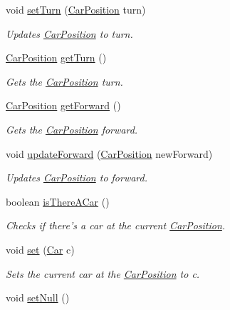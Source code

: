 \begin{DoxyCompactItemize}
void \hyperlink{class_car_position_abfa74c31e5ca43d0c2c06f637ee8533f}{set\+Turn} (\hyperlink{class_car_position}{Car\+Position} turn)
\begin{DoxyCompactList}\small\item\em Updates \hyperlink{class_car_position}{Car\+Position} to turn. \end{DoxyCompactList}\item 
\hyperlink{class_car_position}{Car\+Position} \hyperlink{class_car_position_a01b5b7e2cb4c51114e3f42e7fa150c74}{get\+Turn} ()
\begin{DoxyCompactList}\small\item\em Gets the \hyperlink{class_car_position}{Car\+Position} turn. \end{DoxyCompactList}\item 
\hyperlink{class_car_position}{Car\+Position} \hyperlink{class_car_position_a4238bc30010dbc3c079fe319809f9829}{get\+Forward} ()
\begin{DoxyCompactList}\small\item\em Gets the \hyperlink{class_car_position}{Car\+Position} forward. \end{DoxyCompactList}\item 
void \hyperlink{class_car_position_aed958712c7c0614d615e7e6693fea66d}{update\+Forward} (\hyperlink{class_car_position}{Car\+Position} new\+Forward)
\begin{DoxyCompactList}\small\item\em Updates \hyperlink{class_car_position}{Car\+Position} to forward. \end{DoxyCompactList}\item 
boolean \hyperlink{class_car_position_a74eb829a0810b734335cffa0eb7942f6}{is\+There\+A\+Car} ()
\begin{DoxyCompactList}\small\item\em Checks if there's a car at the current \hyperlink{class_car_position}{Car\+Position}. \end{DoxyCompactList}\item 
void \hyperlink{class_car_position_acd286a6c991daf457a5c4bf8e166d5bc}{set} (\hyperlink{class_car}{Car} c)
\begin{DoxyCompactList}\small\item\em Sets the current car at the \hyperlink{class_car_position}{Car\+Position} to c. \end{DoxyCompactList}\item 
\hypertarget{class_car_position_af6c2c343220e88c043b1ee80b29854a3}{void \hyperlink{class_car_position_af6c2c343220e88c043b1ee80b29854a3}{set\+Null} ()}\label{class_car_position_af6c2c343220e88c043b1ee80b29854a3}


\end{DoxyCompactItemize}
